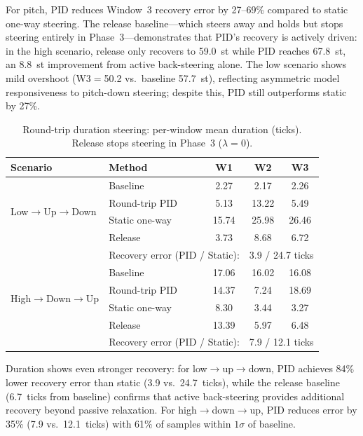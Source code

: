 \documentclass{article}
\theoremstyle{plain}
\begin{document}
For pitch, PID reduces Window~3 recovery error by 27--69\% compared to static one-way steering. The release baseline---which steers away and holds but stops steering entirely in Phase~3---demonstrates that PID's recovery is actively driven: in the high scenario, release only recovers to 59.0~st while PID reaches 67.8~st, an 8.8~st improvement from active back-steering alone. The low scenario shows mild overshoot (W3$=$50.2 vs.~baseline 57.7~st), reflecting asymmetric model responsiveness to pitch-down steering; despite this, PID still outperforms static by 27\%.

\begin{table}[h]
  \caption{Round-trip duration steering: per-window mean duration (ticks). Release stops steering in Phase~3 ($\lambda{=}0$).}
  \label{tab:roundtrip_duration}
  \begin{center}
  \begin{small}
  \begin{tabular}{llccc}
    \toprule
    Scenario & Method & W1 & W2 & W3 \\
    \midrule
    \multirow{4}{*}{Low$\to$Up$\to$Down}
    & Baseline & 2.27 & 2.17 & 2.26 \\
    & Round-trip PID & 5.13 & 13.22 & 5.49 \\
    & Static one-way & 15.74 & 25.98 & 26.46 \\
    & Release & 3.73 & 8.68 & 6.72 \\
    \midrule
    & \multicolumn{2}{l}{Recovery error (PID / Static):} & \multicolumn{2}{c}{3.9 / 24.7 ticks} \\
    \midrule
    \multirow{4}{*}{High$\to$Down$\to$Up}
    & Baseline & 17.06 & 16.02 & 16.08 \\
    & Round-trip PID & 14.37 & 7.24 & 18.69 \\
    & Static one-way & 8.30 & 3.44 & 3.27 \\
    & Release & 13.39 & 5.97 & 6.48 \\
    \midrule
    & \multicolumn{2}{l}{Recovery error (PID / Static):} & \multicolumn{2}{c}{7.9 / 12.1 ticks} \\
    \bottomrule
  \end{tabular}
  \end{small}
  \end{center}
\end{table}

Duration shows even stronger recovery: for low$\to$up$\to$down, PID achieves 84\% lower recovery error than static (3.9 vs.\ 24.7~ticks), while the release baseline (6.7~ticks from baseline) confirms that active back-steering provides additional recovery beyond passive relaxation. For high$\to$down$\to$up, PID reduces error by 35\% (7.9 vs.\ 12.1~ticks) with 61\% of samples within $1\sigma$ of baseline.
\end{document}
